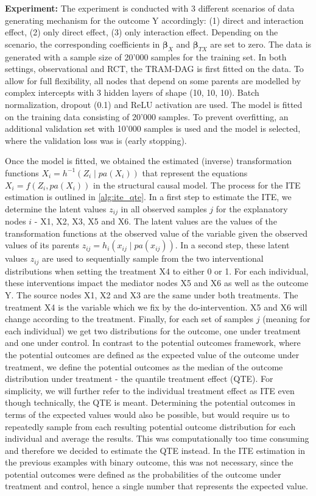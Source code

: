 \textbf{Experiment: } The experiment is conducted with 3 different scenarios of data generating mechanism for the outcome Y accordingly: (1) direct and interaction effect, (2) only direct effect, (3) only interaction effect. Depending on the scenario, the corresponding coefficients in $\boldsymbol{\beta}_{X}$ and $\boldsymbol{\beta}_{TX}$ are set to zero. The data is generated with a sample size of 20'000 samples for the training set. In both settings, observational and RCT, the TRAM-DAG is first fitted on the data. To allow for full flexibility, all nodes that depend on some parents are modelled by complex intercepts with 3 hidden layers of shape (10, 10, 10). Batch normalization, dropout (0.1) and ReLU activation are used. The model is fitted on the training data consisting of 20'000 samples. To prevent overfitting, an additional validation set with 10'000 samples is used and the model is selected, where the validation loss was is (early stopping).


Once the model is fitted, we obtained the estimated (inverse) transformation functions $X_i = h^{-1}(Z_i \mid pa(X_i))$ that represent the equations $X_i = f(Z_i, pa(X_i))$ in the structural causal model. The process for the ITE estimation is outlined in \ref{alg:ite_qte}. In a first step to estimate the ITE, we determine the latent values $z_{ij}$ in all observed samples $j$ for the explanatory nodes $i$ - X1, X2, X3, X5 and X6. The latent values are the values of the transformation functions at the observed value of the variable given the observed values of its parents $z_{ij} = h_i(x_{ij} \mid pa(x_{ij}))$. In a second step, these latent values $z_{ij}$ are used to sequentially sample from the two interventional distributions when setting the treatment X4 to either 0 or 1. For each individual, these interventions impact the mediator nodes X5 and X6 as well as the outcome Y. The source nodes X1, X2 and X3 are the same under both treatments. The treatment X4 is the variable which we fix by the do-intervention. X5 and X6 will change according to the treatment. Finally, for each set of samples $j$ (meaning for each individual) we get two distributions for the outcome, one under treatment and one under control. In contrast to the potential outcomes framework, where the potential outcomes are defined as the expected value of the outcome under treatment, we define the potential outcomes as the median of the outcome distribution under treatment - the quantile treatment effect (QTE). For simplicity, we will further refer to the individual treatment effect as ITE even though technically, the QTE is meant. Determining the potential outcomes in terms of the expected values would also be possible, but would require us to repeatedly sample from each resulting potential outcome distribution for each individual and average the results. This was computationally too time consuming and therefore we decided to estimate the QTE instead. In the ITE estimation in the previous examples with binary outcome, this was not necessary, since the potential outcomes were defined as the probabilities of the outcome under treatment and control, hence a single number that represents the expected value.


